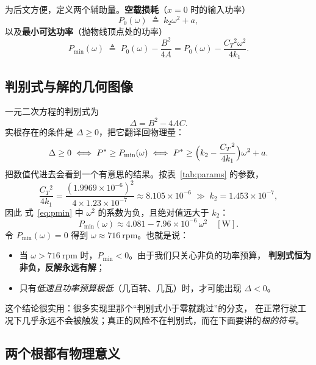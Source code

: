 \documentclass[cn,blue,11pt,device=normal]{elegantnote}
\newcommand{\CT}{C_{T}{}}
\newcommand{\fref}[1]{式~\eqref{#1}}
\begin{document}
为后文方便，定义两个辅助量。\textbf{空载损耗}（$x=0$ 时的输入功率）
\begin{equation}\label{eq:noload}
  P_0(\omega) \;\triangleq\; k_2\omega^2 + a ,
\end{equation}
以及\textbf{最小可达功率}（抛物线顶点处的功率）
\begin{equation}\label{eq:pmin}
  P_{\min}(\omega) \;\triangleq\; P_0(\omega) - \frac{B^2}{4A}
  = P_0(\omega) - \frac{\CT^2\omega^2}{4k_1}.
\end{equation}

\subsection{判别式与解的几何图像}

一元二次方程的判别式为
\begin{equation}\label{eq:disc}
  \Delta = B^2 - 4AC .
\end{equation}
实根存在的条件是 $\Delta\ge0$，把它翻译回物理量：
\begin{equation}\label{eq:cond}
  \Delta \ge 0
  \iff P^{\ast} \ge P_{\min}(\omega)
  \iff P^{\ast} \ge \Bigl(k_2 - \frac{\CT^2}{4k_1}\Bigr)\omega^{2} + a .
\end{equation}
把数值代进去会看到一个有意思的结果。按表~\ref{tab:params} 的参数，
\begin{equation}
  \frac{\CT^{2}}{4k_1} = \frac{(1.9969\times10^{-6})^{2}}{4\times1.23\times10^{-7}}
  \approx 8.105\times10^{-6}
  \;\gg\; k_2 = 1.453\times10^{-7},
\end{equation}
因此 \fref{eq:pmin} 中 $\omega^2$ 的系数为负，且绝对值远大于 $k_2$：
\begin{equation}\label{eq:pminnum}
  P_{\min}(\omega) \approx 4.081 - 7.96\times10^{-6}\,\omega^{2}\quad[\mathrm{W}].
\end{equation}
令 $P_{\min}(\omega)=0$ 得到 $\omega\approx716\ \mathrm{rpm}$。也就是说：

\begin{itemize}
  \item 当 $\omega>716\ \mathrm{rpm}$ 时，$P_{\min}<0$。由于我们只关心非负的功率预算，
  \textbf{判别式恒为非负，反解永远有解}；
  \item 只有\emph{低速且功率预算极低}（几百转、几瓦）时，才可能出现 $\Delta<0$。
\end{itemize}
这个结论很实用：很多实现里那个“判别式小于零就跳过”的分支，
在正常行驶工况下几乎永远不会被触发；真正的风险不在判别式，而在下面要讲的\emph{根的符号}。


\subsection{两个根都有物理意义}
\end{document}

